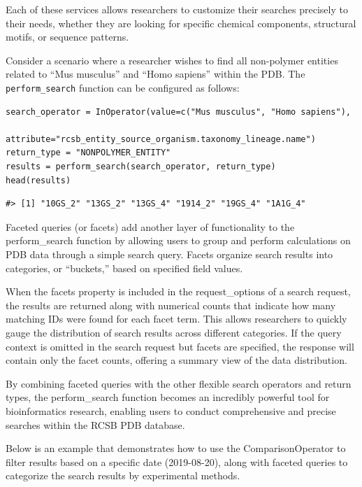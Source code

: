 Each of these services allows researchers to customize their searches precisely to their needs, whether they are looking for specific chemical components, structural motifs, or sequence patterns.

Consider a scenario where a researcher wishes to find all non-polymer entities related to ``Mus musculus'' and ``Homo sapiens'' within the PDB. The \texttt{perform\_search} function can be configured as follows:

\begin{verbatim}
search_operator = InOperator(value=c("Mus musculus", "Homo sapiens"),
                             attribute="rcsb_entity_source_organism.taxonomy_lineage.name")
return_type = "NONPOLYMER_ENTITY"
results = perform_search(search_operator, return_type)
head(results)
\end{verbatim}

\begin{verbatim}
#> [1] "10GS_2" "13GS_2" "13GS_4" "1914_2" "19GS_4" "1A1G_4"
\end{verbatim}

Faceted queries (or facets) add another layer of functionality to the perform\_search function by allowing users to group and perform calculations on PDB data through a simple search query. Facets organize search results into categories, or ``buckets,'' based on specified field values.

When the facets property is included in the request\_options of a search request, the results are returned along with numerical counts that indicate how many matching IDs were found for each facet term. This allows researchers to quickly gauge the distribution of search results across different categories. If the query context is omitted in the search request but facets are specified, the response will contain only the facet counts, offering a summary view of the data distribution.

By combining faceted queries with the other flexible search operators and return types, the perform\_search function becomes an incredibly powerful tool for bioinformatics research, enabling users to conduct comprehensive and precise searches within the RCSB PDB database.

Below is an example that demonstrates how to use the ComparisonOperator to filter results based on a specific date (2019-08-20), along with faceted queries to categorize the search results by experimental methods.


